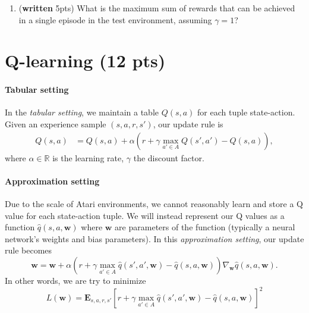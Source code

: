 \documentclass{article}
\begin{document}
\begin{enumerate}
\item (\textbf{written} 5pts) What is the maximum sum of rewards that can be achieved in a single episode in the test environment, assuming $\gamma = 1$?
\end{enumerate}


\section{Q-learning (12 pts)}\label{q-learn}

\paragraph{Tabular setting}
In the \emph{tabular setting}, we maintain a table $ Q(s, a) $ for each tuple state-action. Given an experience sample $ (s, a, r, s') $, our update rule is
\begin{equation}
\label{eq1}
\begin{split}
Q(s,a) &= Q(s,a) + \alpha\left(r+\gamma \max_{a' \in A}Q\left(s',a' \right) - Q\left(s, a\right)\right),
\end{split}
\end{equation}
where $\alpha \in \mathbb{R}$ is the learning rate, $ \gamma $ the discount factor. 

\paragraph{Approximation setting} 
Due to the scale of Atari environments, we cannot reasonably learn and store a Q value for each state-action tuple. We will instead represent our Q values as a function $ \hat{q}(s, a, \textbf{w}) $ where $ \textbf{w} $ are parameters of the function (typically a neural network's weights and bias parameters). In this \emph{approximation setting}, our update rule becomes
\begin{equation}
\label{eq2}
\textbf{w} = \textbf{w} + \alpha\left(r+\gamma \max_{a' \in A} \hat{q}\left(s',a', \textbf{w} \right) - \hat{q}\left(s, a, \textbf{w} \right)\right) \nabla_{\textbf{w}}\hat{q}(s,a, \textbf{w}).
\end{equation}
In other words, we are try to minimize
\begin{equation}
L(\textbf{w}) = \mathbf{E}_{s,a,r,s'}{\left[r+\gamma \max_{a' \in A}\hat{q}\left(s',a', \textbf{w} \right) - \hat{q}(s,a, \textbf{w})\right]}^2
\end{equation}
\end{document}

